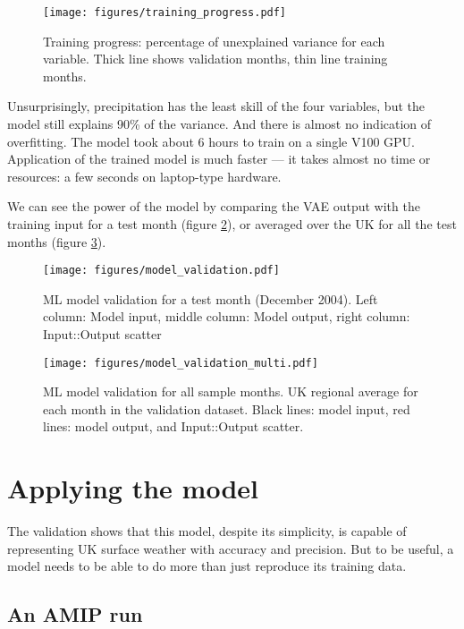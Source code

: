 \documentclass[gmd,manuscript]{copernicus}
\begin{document}
\begin{figure}[h]
\texttt{[image: figures/training\_progress.pdf]}
\caption{Training progress: percentage of unexplained variance for each variable. Thick line shows validation months, thin line training months.}
\label{training_progress}
\end{figure}
    
Unsurprisingly, precipitation has the least skill of the four variables, but the model still explains 90\% of the variance. And there is almost no indication of overfitting. The model took about 6 hours to train on a single V100 GPU. Application of the trained model is much faster --- it takes almost no time or resources: a few seconds on laptop-type hardware.

We can see the power of the model by comparing the VAE output with the training input for a test month (figure \ref{model_validation}), or averaged over the UK for all the test months (figure \ref{model_validation_multi}).

\begin{figure}[h]
\texttt{[image: figures/model\_validation.pdf]}
\caption{ML model validation for a test month (December 2004). Left column: Model input, middle column: Model output, right column: Input::Output scatter}
\label{model_validation}
\end{figure}


\begin{figure}[h]
\texttt{[image: figures/model\_validation\_multi.pdf]}
\caption{ML model validation for all sample months. UK regional average for each month in the validation dataset. Black lines: model input, red lines: model output, and Input::Output scatter.}
\label{model_validation_multi}
\end{figure}


\section{Applying the model}

The validation shows that this model, despite its simplicity, is capable of representing UK surface weather with accuracy and precision. But to be useful, a model needs to be able to do more than just reproduce its training data.


\subsection{An AMIP run}
\end{document}
